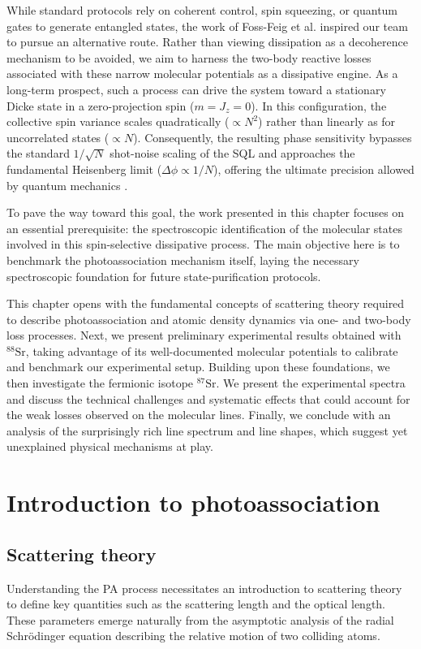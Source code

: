 While standard protocols rely on coherent control, spin squeezing, or quantum gates to generate entangled states, the work of Foss-Feig et al. \cite{foss-feig_steady-state_2012} inspired our team to pursue 
an alternative route. Rather than viewing dissipation as a decoherence mechanism to be avoided, we aim to harness the two-body reactive losses associated with these narrow molecular potentials as a dissipative 
engine. As a long-term prospect, such a process can drive the system toward a stationary Dicke state in a zero-projection spin ($m = J_z = 0$). In this configuration, the collective spin variance scales 
quadratically ($\propto N^2$) rather than linearly as for uncorrelated states ($\propto N$). Consequently, the resulting phase sensitivity bypasses the standard $1/\sqrt{N}$ shot-noise scaling of the SQL and 
approaches the fundamental Heisenberg limit ($\Delta\phi \propto 1/N$), offering the ultimate precision allowed by quantum mechanics \cite{pezze_quantum_2014}.

To pave the way toward this goal, the work presented in this chapter focuses on an essential prerequisite: the spectroscopic identification of the molecular states involved in 
this spin-selective dissipative process. The main objective here is to benchmark the photoassociation mechanism itself, laying the necessary spectroscopic foundation for future
state-purification protocols.

This chapter opens with the fundamental concepts of scattering theory required to describe photoassociation and atomic density dynamics via one- and two-body loss processes. 
Next, we present preliminary experimental results obtained with $^{88}\text{Sr}$, taking advantage of its well-documented molecular potentials to calibrate and benchmark our 
experimental setup. Building upon these foundations, we then investigate the fermionic isotope $^{87}\text{Sr}$. We present the experimental spectra and discuss the technical 
challenges and systematic effects that could account for the weak losses observed on the molecular lines. Finally, we conclude with an analysis of the surprisingly rich line 
spectrum and line shapes, which suggest yet unexplained physical mechanisms at play.

 \section{Introduction to photoassociation}
\subsection{Scattering theory}
Understanding the PA process necessitates an introduction to scattering theory to define key quantities such as the scattering length and the optical length. These parameters 
emerge naturally from the asymptotic 
analysis of the radial Schrödinger equation describing the relative motion of two colliding atoms.

